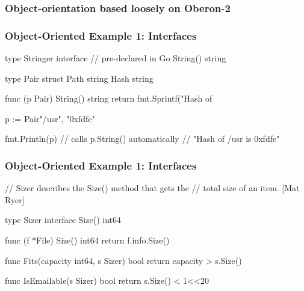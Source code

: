 \documentclass[handout,compress,t,11pt]{beamer}
\begin{document}
\begin{frame}
    \frametitle{Object-orientation based loosely on Oberon-2}
    \vspace{\baselineskip}
    \vspace{\baselineskip}
    \vspace{\baselineskip}
 
    \vspace{4.5\baselineskip}
\end{frame}

\begin{frame}[fragile]
    \frametitle{Object-Oriented Example 1: Interfaces}
\begin{golang}
type Stringer interface { // pre-declared in Go
    String() string
}

type Pair struct {
    Path string
    Hash string
}

func (p Pair) String() string {
	return fmt.Sprintf("Hash of %
}

p := Pair{"/usr", "0xfdfe"}

fmt.Println(p) // calls p.String() automatically
               // "Hash of /usr is 0xfdfe"
\end{golang}
\end{frame}

\begin{frame}[fragile]
    \frametitle{Object-Oriented Example 1: Interfaces}
\begin{golang}
// Sizer describes the Size() method that gets the
// total size of an item. [Mat Ryer]

type Sizer interface {
    Size() int64
}

func (f *File) Size() int64 {
    return f.info.Size()
}

func Fits(capacity int64, s Sizer) bool {
    return capacity > s.Size()
}

func IsEmailable(s Sizer) bool {
    return s.Size() < 1<<20
}
\end{golang}
\end{frame}
\end{document}

